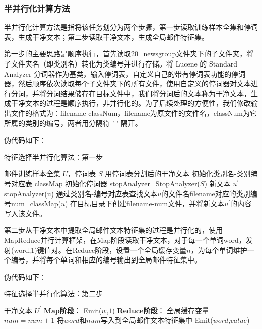 \documentclass[lang=cn,11pt]{elegantpaper}
\begin{document}
\subsubsection{半并行化计算方法}
半并行化计算方法是指将该任务划分为两个步骤，第一步读取训练样本全集和停词表，生成干净文本；第二步读取干净文本，生成全局邮件特征集。\par
第一步的主要思路是顺序执行，首先读取20\_newsgroup文件夹下的子文件夹，将子文件夹名（即类别名）转化为类编号并进行存储。将 Lucene 的 Standard Analyzer 分词器作为基类，输入停词表，自定义自己的带有停词表功能的停词器，然后顺序依次读取每个子文件夹下的所有文件，使用自定义的停词器对文本进行分词，并将分词结果储存在目标文件中，我们将分词后的文本称为干净文本，生成干净文本的过程是顺序执行，非并行化的。为了后续处理的方便性，我们修改输出文件的格式为：filename-classNum，filename为原文件的文件名，classNum为它所属的类别的编号，两者用分隔符 '-' 隔开。\par
伪代码如下：
\begin{algorithm}[htb]  
  \caption{特征选择半并行化算法：第一步}  
  \label{alg:Framwork}
  \begin{algorithmic}[1]
    \Require
    邮件训练样本全集 $U$，停词表 $S$
    \Ensure
    用停词表分割后的干净文本
    \State 初始化类别名-类别编号对应表 classMap
    \State 初始化停词器 stopAnalyzer=StopAnalyzer($S$)
      \State 新文本 $u^\prime$ = stopAnalyzer(u)
      \State 通过类别名-编号对应表查找文本$u$的文件名filename对应的类别编号num=classMap($u$)
      \State 在目标目录下创建filename-num文件，并将新文本$u^\prime$的内容写入该文件。
   \EndFor
  \end{algorithmic}
\end{algorithm}
第二步从干净文本中提取全局邮件文本特征集的过程是并行化的，使用MapReduce并行计算框架，在Map阶段读取干净文本，对于每一个单词word，发射(word,1)键值对。在Reduce阶段，设置一个全局缓存变量$n$，为每个单词维护一个编号，并将每个单词和相应的编号输出到全局邮件特征集中。\par
伪代码如下：
\begin{algorithm}[htb]  
  \caption{特征选择半并行化算法：第二步}  
  \label{alg:Framwork}
  \begin{algorithmic}[1]
    \Require
    干净文本 $U^\prime$
    \Ensure
    \State \textbf{Map阶段}：
        \State Emit($w$,$1$)
      \EndFor
    \EndFunction
    \State \textbf{Reduce阶段}：
      \State 全局缓存变量$num=num+1$
      \State 将$word$和$num$写入到全局邮件文本特征集中
      \State Emit($word$,$value$)
    \EndFunction
  \end{algorithmic}
\end{algorithm}
\end{document}

